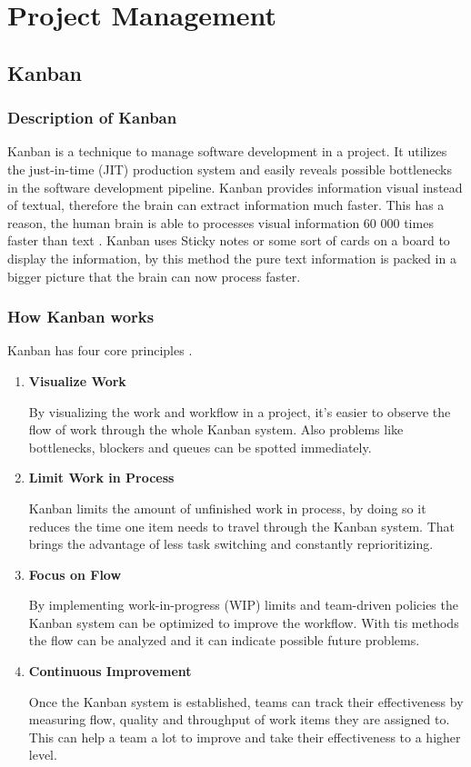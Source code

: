 \chapter{Project Management}
\label{ch:Project Management}

\section{Kanban}
\subsection{Description of Kanban}
Kanban is a technique to manage software development in a project. It utilizes the just-in-time (JIT) production system and easily reveals possible bottlenecks in the software development pipeline. Kanban provides information visual instead of textual, therefore the brain can extract information much faster. This has a reason, the human brain is able to processes visual information 60 000 times faster than text \cite{WhatIsKanban}. Kanban uses Sticky notes or some sort of cards on a board to display the information, by this method the pure text information is packed in a bigger picture that the brain can now process faster.
\subsection{How Kanban works}
Kanban has four core principles \cite{WhatIsKanban}.
\begin{enumerate}
    \item \textbf{Visualize Work}

    By visualizing the work and workflow in a project, it's easier to observe the flow of work through the whole Kanban system. Also problems like bottlenecks, blockers and queues can be spotted immediately.

    \item \textbf{Limit Work in Process}

    Kanban limits the amount of unfinished work in process, by doing so it reduces the time one item needs to travel through the Kanban system. That brings the advantage of less task switching and constantly reprioritizing.

    \item \textbf{Focus on Flow}

    By implementing work-in-progress (WIP) limits and team-driven policies the Kanban system can be optimized to improve the workflow. With tis methods the flow can be analyzed and it can indicate possible future problems.

    \item \textbf{Continuous Improvement}

    Once the Kanban system is established, teams can track their effectiveness by measuring flow, quality and throughput of work items they are assigned to. This can help a team a lot to improve and take their effectiveness to a higher level.
\end{enumerate}
